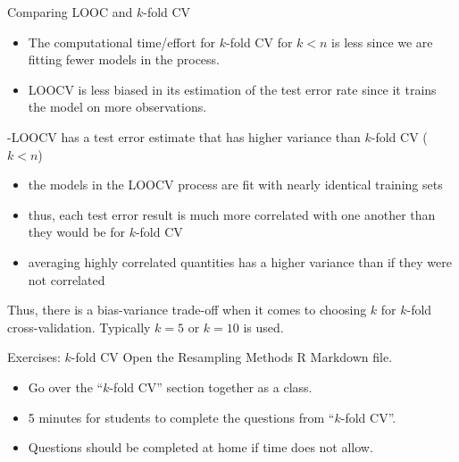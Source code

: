 \documentclass[
  ignorenonframetext,
  aspectratio=169,
]{beamer}
\begin{document}
\begin{frame}{Comparing LOOC and \(k\)-fold CV}
\protect\hypertarget{comparing-looc-and-k-fold-cv}{}
\begin{itemize}
\item
  The
  \alert{computational time/effort for $k$-fold CV for $k < n$ is less}
  since we are fitting fewer models in the process.
\item
  \alert{LOOCV is less biased} in its estimation of the test error rate
  since it trains the model on more observations.
\end{itemize}

-\alert{LOOCV has a test error estimate that has higher variance} than
\(k\)-fold CV (\(k < n\))

\begin{itemize}
\item
  the models in the LOOCV process are fit with nearly identical training
  sets
\item
  thus, each test error result is much more correlated with one another
  than they would be for \(k\)-fold CV
\item
  averaging highly correlated quantities has a higher variance than if
  they were not correlated
\end{itemize}

Thus, there is a bias-variance trade-off when it comes to choosing \(k\)
for \(k\)-fold cross-validation. Typically \(k = 5\) or \(k = 10\) is
used.
\end{frame}

\begin{frame}{Exercises: \(k\)-fold CV}
\protect\hypertarget{exercises-k-fold-cv}{}
Open the Resampling Methods R Markdown file.

\begin{itemize}
\item
  Go over the ``\(k\)-fold CV'' section together as a class.
\item
  5 minutes for students to complete the questions from ``\(k\)-fold
  CV''.
\item
  Questions should be completed at home if time does not allow.
\end{itemize}
\end{frame}
\end{document}
